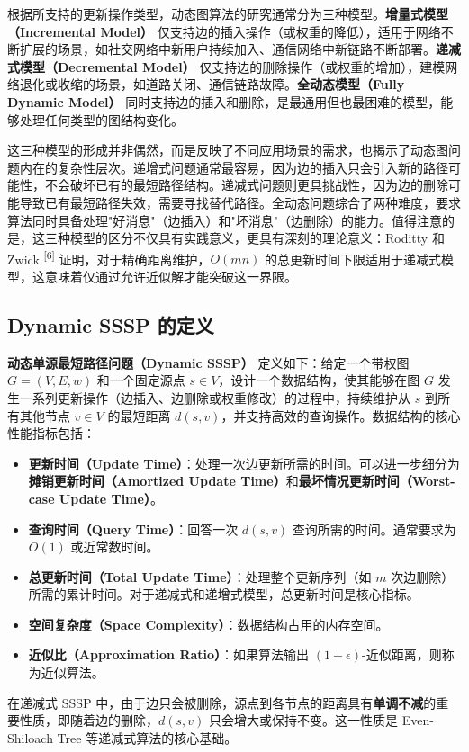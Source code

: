 \documentclass[12pt,a4paper]{ctexart}
\begin{document}
根据所支持的更新操作类型，动态图算法的研究通常分为三种模型。\textbf{增量式模型（Incremental Model）} 仅支持边的插入操作（或权重的降低），适用于网络不断扩展的场景，如社交网络中新用户持续加入、通信网络中新链路不断部署。\textbf{递减式模型（Decremental Model）} 仅支持边的删除操作（或权重的增加），建模网络退化或收缩的场景，如道路关闭、通信链路故障。\textbf{全动态模型（Fully Dynamic Model）} 同时支持边的插入和删除，是最通用但也最困难的模型，能够处理任何类型的图结构变化。

这三种模型的形成并非偶然，而是反映了不同应用场景的需求，也揭示了动态图问题内在的复杂性层次。递增式问题通常最容易，因为边的插入只会引入新的路径可能性，不会破坏已有的最短路径结构。递减式问题则更具挑战性，因为边的删除可能导致已有最短路径失效，需要寻找替代路径。全动态问题综合了两种难度，要求算法同时具备处理"好消息"（边插入）和"坏消息"（边删除）的能力。值得注意的是，这三种模型的区分不仅具有实践意义，更具有深刻的理论意义：Roditty 和 Zwick \textsuperscript{[6]}  证明，对于精确距离维护，$O(mn)$ 的总更新时间下限适用于递减式模型，这意味着仅通过允许近似解才能突破这一界限。

\subsection{Dynamic SSSP 的定义}

\textbf{动态单源最短路径问题（Dynamic SSSP）} 定义如下：给定一个带权图 $G=(V,E,w)$ 和一个固定源点 $s\in V$，设计一个数据结构，使其能够在图 $G$ 发生一系列更新操作（边插入、边删除或权重修改）的过程中，持续维护从 $s$ 到所有其他节点 $v\in V$ 的最短距离 $d(s,v)$，并支持高效的查询操作。数据结构的核心性能指标包括：

\begin{itemize}
\item \textbf{更新时间（Update Time）}：处理一次边更新所需的时间。可以进一步细分为\textbf{摊销更新时间（Amortized Update Time）}和\textbf{最坏情况更新时间（Worst-case Update Time）}。
\item \textbf{查询时间（Query Time）}：回答一次 $d(s,v)$ 查询所需的时间。通常要求为 $O(1)$ 或近常数时间。
\item \textbf{总更新时间（Total Update Time）}：处理整个更新序列（如 $m$ 次边删除）所需的累计时间。对于递减式和递增式模型，总更新时间是核心指标。
\item \textbf{空间复杂度（Space Complexity）}：数据结构占用的内存空间。
\item \textbf{近似比（Approximation Ratio）}：如果算法输出 $(1+\epsilon)$-近似距离，则称为近似算法。

\end{itemize}
在递减式 SSSP 中，由于边只会被删除，源点到各节点的距离具有\textbf{单调不减}的重要性质，即随着边的删除，$d(s,v)$ 只会增大或保持不变。这一性质是 Even-Shiloach Tree 等递减式算法的核心基础。
\end{document}
